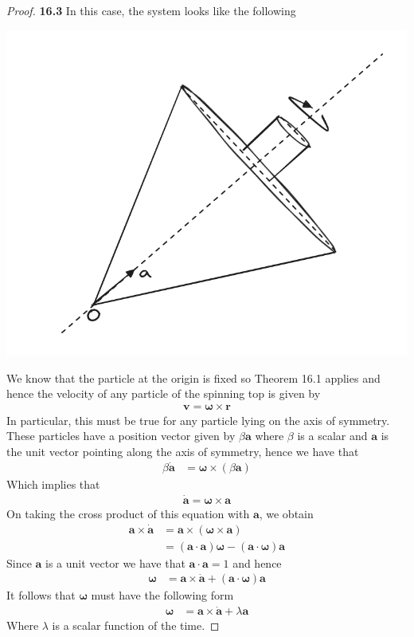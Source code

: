 \documentclass[11pt]{article}
\theoremstyle{definition}
\begin{document}
\begin{proof}{\textbf{16.3}}
    In this case, the system looks like the following
    \begin{center}
        \includegraphics[scale=0.35]{ch16-3.png}
    \end{center}
    We know that the particle at the origin is fixed so Theorem 16.1 
    applies and hence the velocity of any particle of the spinning top
    is given by
    \begin{align*}
        \bm{v} = \bm{\omega} \times \bm{r}
    \end{align*}
    In particular, this must be true for any particle lying on the axis of 
    symmetry. These particles have a position vector given by $\beta\bm{a}$
    where $\beta$ is a scalar and $\bm{a}$ is the unit vector pointing along
    the axis of symmetry, hence we have that 
    \begin{align*}
        \beta\bm{\dot{a}} &= \bm{\omega} \times (\beta\bm{a})
    \end{align*}
    Which implies that
    \begin{align*}
        \bm{\dot{a}} = \bm{\omega} \times \bm{a}
    \end{align*}
    On taking the cross product of this equation with $\bm{a}$, we obtain
    \begin{align*}
        \bm{a} \times \bm{\dot{a}} 
        &= \bm{a} \times (\bm{\omega} \times \bm{a})\\
        &= (\bm{a} \cdot \bm{a})\bm{\omega} - (\bm{a} \cdot \bm{\omega})\bm{a}
    \end{align*}
    Since $\bm{a}$ is a unit vector we have that $\bm{a} \cdot \bm{a} = 1$
    and hence 
    \begin{align*}
        \bm{\omega}
        &= \bm{a} \times \bm{\dot{a}} + (\bm{a} \cdot \bm{\omega})\bm{a}
    \end{align*}    
    It follows that $\bm{\omega}$ must have the following form
    \begin{align*}
        \bm{\omega}
        &= \bm{a} \times \bm{\dot{a}} + \lambda\bm{a}
    \end{align*}
    Where $\lambda$ is a scalar function of the time.
\end{proof}
\end{document}
